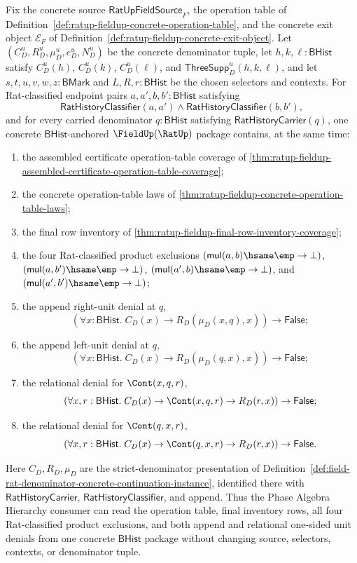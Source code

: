 \begin{theorem}
\label{thm:ratup-fieldup-operation-table-final-inventory-four-endpoint-unit-coverage}
Fix the concrete source $\mathsf{RatUpFieldSource}_F$, the operation table of
Definition~\ref{def:ratup-fieldup-concrete-operation-table}, and the concrete
exit object $\mathcal E_F$ of
Definition~\ref{def:ratup-fieldup-concrete-exit-object}. Let
$(C_D^u,R_D^u,\mu_D^u,e_D^u,N_D^u)$ be the concrete denominator tuple, let
$h,k,\ell:\mathsf{BHist}$ satisfy $C_D^u(h)$, $C_D^u(k)$, $C_D^u(\ell)$, and
$\mathsf{ThreeSupp}_D^u(h,k,\ell)$, and let
$s,t,u,v,w,z:\mathsf{BMark}$ and $L,R,r:\mathsf{BHist}$ be the chosen selectors
and contexts. For Rat-classified endpoint pairs
$a,a',b,b':\mathsf{BHist}$ satisfying
$$
\mathsf{RatHistoryClassifier}(a,a')
\land
\mathsf{RatHistoryClassifier}(b,b'),
$$
and for every carried denominator $q:\mathsf{BHist}$ satisfying
$\mathsf{RatHistoryCarrier}(q)$, one concrete $\mathsf{BHist}$-anchored
$\FieldUp(\RatUp)$ package contains, at the same time:
\begin{enumerate}
  \item the assembled certificate operation-table coverage of
  \autoref{thm:ratup-fieldup-assembled-certificate-operation-table-coverage};
  \item the concrete operation-table laws of
  \autoref{thm:ratup-fieldup-concrete-operation-table-laws};
  \item the final row inventory of
  \autoref{thm:ratup-fieldup-final-row-inventory-coverage};
  \item the four Rat-classified product exclusions
  $(\mathsf{mul}(a,b)\hsame\emp\to\bot)$,
  $(\mathsf{mul}(a,b')\hsame\emp\to\bot)$,
  $(\mathsf{mul}(a',b)\hsame\emp\to\bot)$, and
  $(\mathsf{mul}(a',b')\hsame\emp\to\bot)$;
  \item the append right-unit denial at $q$,
  $$
  (\forall x:\mathsf{BHist}.\;
  C_D(x)\to R_D(\mu_D(x,q),x))\to \mathsf{False};
  $$
  \item the append left-unit denial at $q$,
  $$
  (\forall x:\mathsf{BHist}.\;
  C_D(x)\to R_D(\mu_D(q,x),x))\to \mathsf{False};
  $$
  \item the relational denial for $\Cont(x,q,r)$,
  $$
  (\forall x,r:\mathsf{BHist}.\;
  C_D(x)\to \Cont(x,q,r)\to R_D(r,x))\to \mathsf{False};
  $$
  \item the relational denial for $\Cont(q,x,r)$,
  $$
  (\forall x,r:\mathsf{BHist}.\;
  C_D(x)\to \Cont(q,x,r)\to R_D(r,x))\to \mathsf{False}.
  $$
\end{enumerate}
Here $C_D,R_D,\mu_D$ are the strict-denominator presentation of
Definition~\ref{def:field-rat-denominator-concrete-continuation-instance},
identified there with $\mathsf{RatHistoryCarrier}$,
$\mathsf{RatHistoryClassifier}$, and append. Thus the Phase Algebra Hierarchy
consumer can read the operation table, final inventory rows, all four
Rat-classified product exclusions, and both append and relational one-sided
unit denials from one concrete $\mathsf{BHist}$ package without changing
source, selectors, contexts, or denominator tuple.
\end{theorem}
